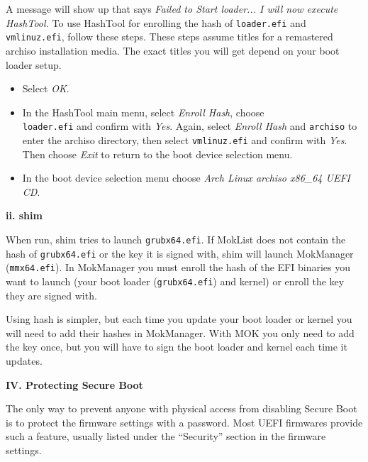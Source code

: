 \documentclass{exam-zh}
\begin{document}
A message will show up that says \textit{Failed to Start loader... I will now execute HashTool.} To use HashTool for enrolling the hash of \texttt{loader.efi} and \texttt{vmlinuz.efi}, follow these steps. These steps assume titles for a remastered archiso installation media. The exact titles you will get depend on your boot loader setup.

\begin{itemize}
\item Select \textit{OK}.

\item In the HashTool main menu, select \textit{Enroll Hash}, choose \texttt{\\loader.efi} and confirm with \textit{Yes}. Again, select \textit{Enroll Hash} and \texttt{archiso} to enter the archiso directory, then select \texttt{vmlinuz.efi} and confirm with \textit{Yes}. Then choose \textit{Exit} to return to the boot device selection menu.

\item In the boot device selection menu choose \textit{Arch Linux archiso x86\_64 UEFI CD}.
\end{itemize}

\textbf{ii. shim}

When run, shim tries to launch \texttt{grubx64.efi}. If MokList does not contain the hash of \texttt{grubx64.efi} or the key it is signed with, shim will launch MokManager (\texttt{mmx64.efi}). In MokManager you must enroll the hash of the EFI binaries you want to launch (your boot loader (\texttt{grubx64.efi}) and kernel) or enroll the key they are signed with.

Using hash is simpler, but each time you update your boot loader or kernel you will need to add their hashes in MokManager. With MOK you only need to add the key once, but you will have to sign the boot loader and kernel each time it updates.

\par
\endgroup

\textbf{IV. Protecting Secure Boot}

The only way to prevent anyone with physical access from disabling Secure Boot is to protect the firmware settings with a password. Most UEFI firmwares provide such a feature, usually listed under the ``Security'' section in the firmware settings.
\end{document}
